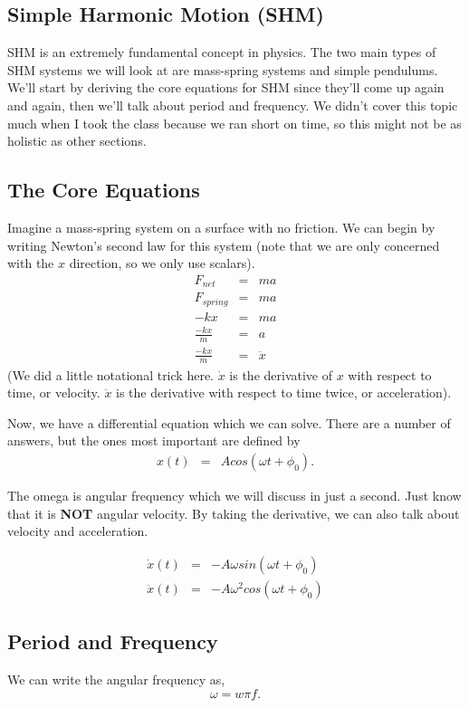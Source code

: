 \subsection{Simple Harmonic Motion (SHM)}
SHM is an extremely fundamental concept in physics. The two main types of SHM systems we will look at are mass-spring systems and simple pendulums. We'll
start by deriving the core equations for SHM since they'll come up again and again, then we'll talk about period and frequency. We didn't cover this
topic much when I took the class because we ran short on time, so this might not be as holistic as other sections.

\subsection{The Core Equations}
Imagine a mass-spring system on a surface with no friction. We can begin by writing Newton's
second law for this system (note that we are only concerned with the $x$ direction, so we only use scalars).
\begin{eqnarray*}
    F_{net} &=& ma \\
    F_{spring} &=& ma \\
    -kx &=& ma \\
    \frac{-kx}{m} &=& a \\
    \frac{-kx}{m} &=& \ddot{x}
\end{eqnarray*}
(We did a little notational trick here. $\dot{x}$ is the derivative of $x$ with respect to time, or velocity. $\ddot{x}$ is the derivative with respect
to time twice, or acceleration).

Now, we have a differential equation which we can solve. There are a number of answers, but the ones most important are defined by
\begin{eqnarray} \label{eq : SHM}
    x(t) &=& Acos(\omega t + \phi_0).
\end{eqnarray}

The omega is angular frequency which we will discuss in just a second. Just know that it is \textbf{NOT} angular 
velocity. By taking the derivative, we can also talk about velocity and acceleration.

\begin{eqnarray} \label{eq : SHMav}
    \dot{x}(t) &=& -A \omega sin(\omega t + \phi_0) \\
    \ddot{x}(t) &=& -A \omega^2 cos(\omega t + \phi_0)
\end{eqnarray}

\subsection{Period and Frequency}
We can write the angular frequency as,
\begin{equation}
    \omega = w \pi f.
\end{equation}

